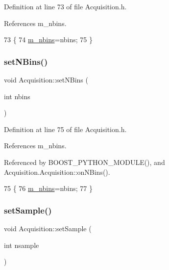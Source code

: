 Definition at line 73 of file Acquisition.\+h.



References m\+\_\+nbins.


\begin{DoxyCode}
73                           \{
74     \hyperlink{classAcquisition_a05bccdc4b9ada37beaeba8794ccef12d}{m\_nbins}=nbins;
75   \}
\end{DoxyCode}
\mbox{\label{classAcquisition_a6ee040a009aa48f848b1e12434135db9}} 
\subsubsection{\texorpdfstring{set\+N\+Bins()}{setNBins()}\hspace{0.1cm}{\footnotesize\ttfamily [2/2]}}
{\footnotesize\ttfamily void Acquisition\+::set\+N\+Bins (\begin{DoxyParamCaption}\item[{int}]{nbins }\end{DoxyParamCaption})\hspace{0.3cm}{\ttfamily [inline]}}



Definition at line 75 of file Acquisition.\+h.



References m\+\_\+nbins.



Referenced by B\+O\+O\+S\+T\+\_\+\+P\+Y\+T\+H\+O\+N\+\_\+\+M\+O\+D\+U\+L\+E(), and Acquisition.\+Acquisition\+::on\+N\+Bins().


\begin{DoxyCode}
75                           \{
76     \hyperlink{classAcquisition_a05bccdc4b9ada37beaeba8794ccef12d}{m\_nbins}=nbins;
77   \}
\end{DoxyCode}
\mbox{\label{classAcquisition_ade6fd6483b3e3737fe7dcdffb5065954}} 
\subsubsection{\texorpdfstring{set\+Sample()}{setSample()}\hspace{0.1cm}{\footnotesize\ttfamily [1/2]}}
{\footnotesize\ttfamily void Acquisition\+::set\+Sample (\begin{DoxyParamCaption}\item[{int}]{nsample }\end{DoxyParamCaption})\hspace{0.3cm}{\ttfamily [inline]}}



